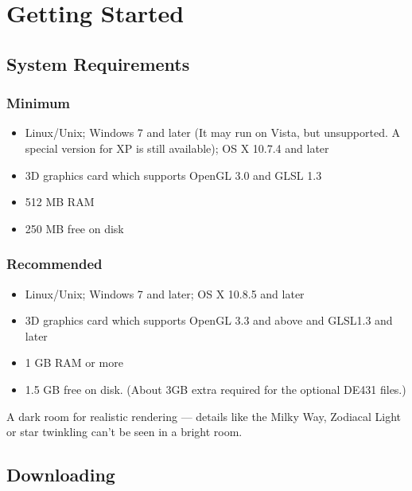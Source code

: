

\chapter{Getting Started}
\label{ch:GettingStarted}

\section{System Requirements}
\label{sec:GettingStarted:SystemRequirements}

\subsection{Minimum}
\begin{itemize}
\item Linux/Unix; Windows 7 and later (It may run on Vista, but unsupported. A special version for XP is still available); OS X 10.7.4 and later
\item 3D graphics card which supports OpenGL 3.0 and GLSL 1.3
\item 512 MB RAM
\item 250 MB free on disk
\end{itemize}

\subsection{Recommended}
\begin{itemize}
\item Linux/Unix; Windows 7 and later; OS X 10.8.5 and later
\item 3D graphics card which supports OpenGL 3.3 and above and GLSL1.3 and later
\item 1 GB RAM or more
\item 1.5 GB free on disk. (About 3GB extra required for the optional DE431 files.)
\end{itemize}
 A dark room for realistic rendering --- details like the Milky Way, Zodiacal Light or
star twinkling can't be seen in a bright room.

\section{Downloading}
\label{sec:GettingStarted:Downloading}

